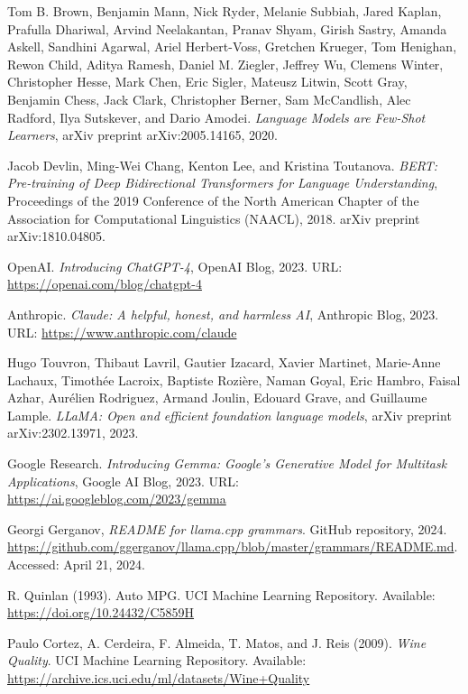 \documentclass{ieeeaccess}
\begin{document}
\begin{thebibliography}{00}
Tom B. Brown, Benjamin Mann, Nick Ryder, Melanie Subbiah, Jared Kaplan, Prafulla Dhariwal, Arvind Neelakantan, Pranav Shyam, Girish Sastry, Amanda Askell, Sandhini Agarwal, Ariel Herbert-Voss, Gretchen Krueger, Tom Henighan, Rewon Child, Aditya Ramesh, Daniel M. Ziegler, Jeffrey Wu, Clemens Winter, Christopher Hesse, Mark Chen, Eric Sigler, Mateusz Litwin, Scott Gray, Benjamin Chess, Jack Clark, Christopher Berner, Sam McCandlish, Alec Radford, Ilya Sutskever, and Dario Amodei.
\textit{Language Models are Few-Shot Learners},
arXiv preprint arXiv:2005.14165, 2020.

Jacob Devlin, Ming-Wei Chang, Kenton Lee, and Kristina Toutanova.
\textit{BERT: Pre-training of Deep Bidirectional Transformers for Language Understanding},
Proceedings of the 2019 Conference of the North American Chapter of the Association for Computational Linguistics (NAACL), 2018.
arXiv preprint arXiv:1810.04805.


OpenAI.
\textit{Introducing ChatGPT-4},
OpenAI Blog, 2023.
URL: \url{https://openai.com/blog/chatgpt-4}

Anthropic.
\textit{Claude: A helpful, honest, and harmless AI},
Anthropic Blog, 2023.
URL: \url{https://www.anthropic.com/claude}

Hugo Touvron, Thibaut Lavril, Gautier Izacard, Xavier Martinet, Marie-Anne Lachaux, Timothée Lacroix, Baptiste Rozière, Naman Goyal, Eric Hambro, Faisal Azhar, Aurélien Rodriguez, Armand Joulin, Edouard Grave, and Guillaume Lample.
\textit{LLaMA: Open and efficient foundation language models},
arXiv preprint arXiv:2302.13971, 2023.

Google Research.
\textit{Introducing Gemma: Google's Generative Model for Multitask Applications},
Google AI Blog, 2023.
URL: \url{https://ai.googleblog.com/2023/gemma}

Georgi Gerganov,
\textit{README for llama.cpp grammars}.
GitHub repository,
2024.
\url{https://github.com/ggerganov/llama.cpp/blob/master/grammars/README.md}.
Accessed: April 21, 2024.

R. Quinlan (1993). Auto MPG. UCI Machine Learning Repository. Available: \url{https://doi.org/10.24432/C5859H}

Paulo Cortez, A. Cerdeira, F. Almeida, T. Matos, and J. Reis (2009). 
\textit{Wine Quality}. 
UCI Machine Learning Repository. 
Available: \url{https://archive.ics.uci.edu/ml/datasets/Wine+Quality}

\end{thebibliography}
\end{document}
